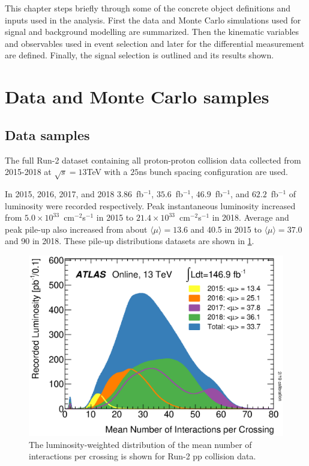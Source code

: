 This chapter steps briefly through some of the concrete object definitions and inputs used in the analysis. First the data and Monte Carlo simulations used for signal and background modelling are summarized. Then the kinematic variables and observables used in event selection and later for the differential measurement are defined. Finally, the signal selection is outlined and its results shown. 

\section{Data and Monte Carlo samples}
\subsection{Data samples}

The full Run-2 dataset containing all proton-proton collision data collected from 2015-2018 at $\sqrt{s}=13$TeV with a $25$ns bunch spacing configuration are used.

In 2015, 2016, 2017, and 2018 $3.86$~fb$^{-1}$, $35.6$~fb$^{-1}$, $46.9$~fb$^{-1}$, and  $62.2$~fb$^{-1}$ of luminosity were recorded respectively. Peak instantaneous luminosity increased from $5.0\times 10^{33}$~cm$^{-2}$s$^{-1}$ in 2015 to $21.4\times 10^{33}$~cm$^{-2}$s$^{-1}$ in 2018. Average and peak pile-up also increased from about $\langle\mu\rangle=13.6$ and 40.5 in 2015 to  $\langle\mu\rangle=37.0$ and 90 in 2018. These pile-up distributions datasets are shown in \ref{fig:mu_profile}. 

\begin{figure}[!htbp]
    \centering 
    \includegraphics[width=0.55\linewidth]{Pictures/mu_2015_2018.eps}
    \caption{The luminosity-weighted distribution of the mean number of interactions per crossing is shown for Run-2 pp collision data. }
    \label{fig:mu_profile}
\end{figure}

